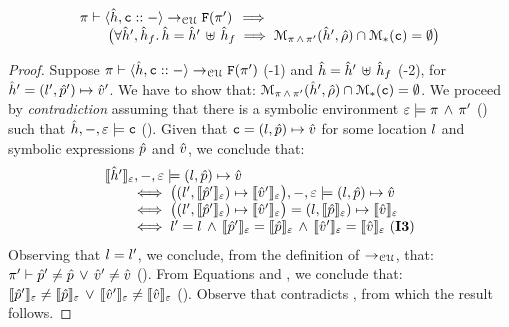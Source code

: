 \begin{lemma} 
$$
\begin{array}{l}
\cellunificationx{\sheap, \cell \lstcons -}{\uno{\pc'}}{\pc} \, \implies \, \\ 
	\qquad  \big(\forall \sheap', \sheap_f . \, \sheap = \sheap' \dunion \sheap_f \implies 
                \smodels{\sheap', \sstore}{\pc \, \wedge \, \pc'} \cap \sepmodels{\cell} = \emptyset \big)
\end{array}
$$
 \end{lemma}
 \begin{proof}
Suppose $\cellunificationx{\sheap, \cell \lstcons -}{\uno{\pc'}}{\pc}$ (\hyp{1}) and 
$\sheap = \sheap' \dunion \sheap_f$ (\hyp{2}), for $\sheap' = (\loc', \sexprp') \mapsto \sexprv'$. 
We have to show that: $\smodels{\sheap', \sstore}{\pc \, \wedge \, \pc'} \cap \sepmodels{\cell} = \emptyset$.
We proceed by \emph{contradiction} assuming that there is a symbolic environment 
$\senv \satisfies \pc \, \wedge \, \pc'$ () such that $\sheap, -, \senv \satisfies \cell$ (). 
Given that $\cell = (\loc, \sexprp) \mapsto \sexprv$ for some location $\loc$ and 
symbolic expressions $\sexprp$ and $\sexprv$, we conclude that: 
$$
\begin{array}{l}
\symbeval{\sheap'}{\senv}, -, \senv \satisfies (\loc, \sexprp) \mapsto \sexprv \\ 
\qquad \iff \big((\loc', \symbeval{\sexprp'}{\senv}) \mapsto \symbeval{\sexprv'}{\senv} \big), -, \senv \satisfies (\loc, \sexprp) \mapsto \sexprv \\ 
\qquad \iff \big((\loc', \symbeval{\sexprp'}{\senv}) \mapsto \symbeval{\sexprv'}{\senv} \big) = (\loc, \symbeval{\sexprp}{\senv}) \mapsto \symbeval{\sexprv}{\senv} \\
\qquad \iff \loc' = \loc \, \wedge \, \symbeval{\sexprp'}{\senv} = \symbeval{\sexprp}{\senv} \, \wedge \, \symbeval{\sexprv'}{\senv} = \symbeval{\sexprv}{\senv} \text{ (\ieq{3})}
\end{array}
$$
Observing that $\loc = \loc'$, we conclude, from the definition of $\rightarrow_{\cal CU}$, that: 
$\pc' \vdash \sexprp' \neq \sexprp \, \vee \, \sexprv' \neq \sexprv$ (). 
From Equations  and , we conclude that: 
$\symbeval{\sexprp'}{\senv} \neq \symbeval{\sexprp}{\senv} \, \vee \, \symbeval{\sexprv'}{\senv} \neq \symbeval{\sexprv}{\senv}$ (). 
Observe that  contradicts , from which the result follows.
\end{proof}
 
